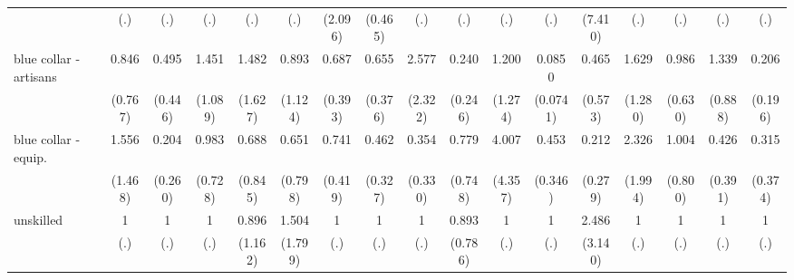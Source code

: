 {\begin{tabular}{l*{16}{c}}
                    &         (.)         &         (.)         &         (.)         &         (.)         &         (.)         &     (2.096)         &     (0.465)         &         (.)         &         (.)         &         (.)         &         (.)         &     (7.410)         &         (.)         &         (.)         &         (.)         &         (.)         \\
[1em]
blue collar - artisans&       0.846         &       0.495         &       1.451         &       1.482         &       0.893         &       0.687         &       0.655         &       2.577         &       0.240         &       1.200         &      0.0850\sym{**} &       0.465         &       1.629         &       0.986         &       1.339         &       0.206         \\
                    &     (0.767)         &     (0.446)         &     (1.089)         &     (1.627)         &     (1.124)         &     (0.393)         &     (0.376)         &     (2.322)         &     (0.246)         &     (1.274)         &    (0.0741)         &     (0.573)         &     (1.280)         &     (0.630)         &     (0.888)         &     (0.196)         \\
[1em]
blue collar - equip.&       1.556         &       0.204         &       0.983         &       0.688         &       0.651         &       0.741         &       0.462         &       0.354         &       0.779         &       4.007         &       0.453         &       0.212         &       2.326         &       1.004         &       0.426         &       0.315         \\
                    &     (1.468)         &     (0.260)         &     (0.728)         &     (0.845)         &     (0.798)         &     (0.419)         &     (0.327)         &     (0.330)         &     (0.748)         &     (4.357)         &     (0.346)         &     (0.279)         &     (1.994)         &     (0.800)         &     (0.391)         &     (0.374)         \\
[1em]
unskilled           &           1         &           1         &           1         &       0.896         &       1.504         &           1         &           1         &           1         &       0.893         &           1         &           1         &       2.486         &           1         &           1         &           1         &           1         \\
                    &         (.)         &         (.)         &         (.)         &     (1.162)         &     (1.799)         &         (.)         &         (.)         &         (.)         &     (0.786)         &         (.)         &         (.)         &     (3.140)         &         (.)         &         (.)         &         (.)         &         (.)         \\

\end{tabular}}
